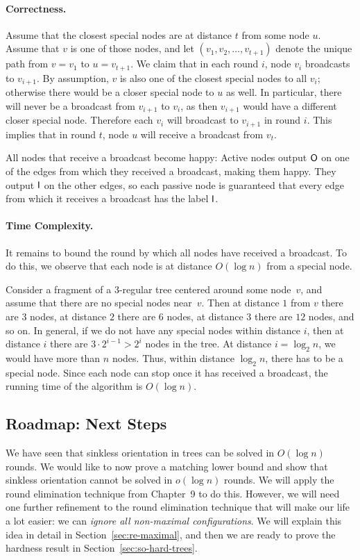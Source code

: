 \paragraph{Correctness.} Assume that the closest special nodes are at distance $t$ from some node $u$. Assume that $v$ is one of those nodes, and let $(v_1, v_2, \dotsc, v_{t+1})$ denote the unique path from $v = v_1$ to $u = v_{t+1}$. We claim that in each round $i$, node $v_{i}$ broadcasts to $v_{i+1}$. By assumption, $v$ is also one of the closest special nodes to all $v_i$; otherwise there would be a closer special node to $u$ as well. 
In particular, there will never be a broadcast from $v_{i+1}$ to $v_i$, as then $v_{i+1}$ would have a different closer special node. Therefore each $v_i$ will broadcast to $v_{i+1}$ in round $i$. This implies that in round $t$, node $u$ will receive a broadcast from $v_t$.

All nodes that receive a broadcast become happy: Active nodes output $\mathsf{O}$ on one of the edges from which they received a broadcast, making them happy. They output $\mathsf{I}$ on the other edges, so each passive node is guaranteed that every edge from which it receives a broadcast has the label $\mathsf{I}$.

\paragraph{Time Complexity.} It remains to bound the round by which all nodes have received a broadcast. To do this, we observe that each node is at distance $O(\log n)$ from a special node.

Consider a fragment of a $3$-regular tree centered around some node~$v$, and assume that there are no special nodes near~$v$. Then at distance $1$ from $v$ there are $3$ nodes, at distance $2$ there are $6$ nodes, at distance $3$ there are $12$ nodes, and so on. In general, if we do not have any special nodes within distance $i$, then at distance $i$ there are 
$
	3\cdot2^{i-1} > 2^i
$
nodes in the tree. At distance $i = \log_2 n$, we would have more than $n$ nodes. Thus, within distance $\log_2 n$, there has to be a special node. Since each node can stop once it has received a broadcast, the running time of the algorithm is $O(\log n)$.

\subsection{Roadmap: Next Steps}

We have seen that sinkless orientation in trees can be solved in $O(\log n)$ rounds. We would like to now prove a matching lower bound and show that sinkless orientation cannot be solved in $o(\log n)$ rounds. We will apply the round elimination technique from Chapter~9 to do this. However, we will need one further refinement to the round elimination technique that will make our life a lot easier: we can \emph{ignore all non-maximal configurations}. We will explain this idea in detail in Section~\ref{sec:re-maximal}, and then we are ready to prove the hardness result in Section~\ref{sec:so-hard-trees}.


